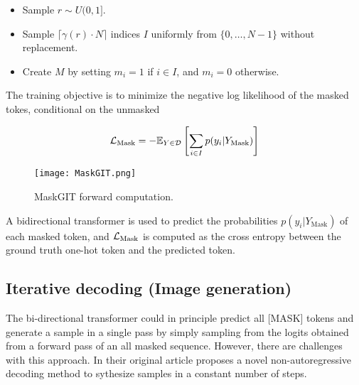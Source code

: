\documentclass[../../thesis.tex]{subfiles}
\begin{document}
\begin{itemize}
    \item Sample $r \sim U(0,1]$.
    \item Sample $\lceil \gamma(r)\cdot N \rceil$ indices $I$ uniformly from $\{0,\dots,N-1\}$ without replacement. 
    \item Create $M$ by setting $m_i = 1$ if $i\in I$, and $m_i = 0$ otherwise.
\end{itemize}

The training objective is to minimize the negative log likelihood of the masked tokes, conditional on the unmasked

\begin{equation}
    \mathcal{L}_\text{Mask} = -\mathbb{E}_{Y\in \mathcal{D}}\left[\sum_{i \in I} p(y_i|Y_\text{Mask} ) \right]
\end{equation}

\begin{figure}[h]
    \texttt{[image: MaskGIT.png]}
    \centering 
    \label{fig:MaskGIT}
    \caption{MaskGIT forward computation.}
\end{figure}

A bidirectional transformer is used to predict the probabilities $p(y_i|Y_\text{Mask})$ of each masked token, and $\mathcal{L}_\text{Mask}$ is computed as the cross entropy between the ground truth one-hot token and the predicted token.





\subsection{Iterative decoding (Image generation)}

The bi-directional transformer could in principle predict all [MASK] tokens and generate a sample in a single pass by simply sampling from the logits obtained from a forward pass of an all masked sequence. However, there are challenges with this approach. In their original article \cite{chang2022maskgit} proposes a novel non-autoregressive decoding method to sythesize samples in a constant number of steps.\newline
\end{document}
